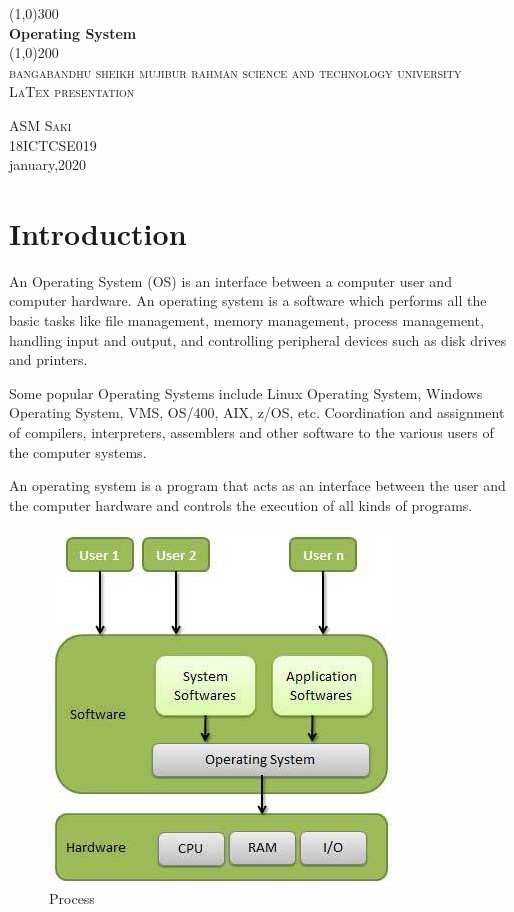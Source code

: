 \documentclass[a4paper,10pt]{article}
\begin{document}
  \begin{titlepage}
  \begin{center}
  \line(1,0){300}\\
  [.25in]
  \huge{\bfseries Operating System}\\
  [2mm]
  \line(1,0){200}\\
  [1.5cm]
  \textsc{\LARGE bangabandhu sheikh mujibur rahman science and technology university}\\
  [.75cm]
  \textsc{\small LaTex presentation}\\
  [10cm]
  \end{center}
 
  
  \begin{flushright}
  \textsc{\huge ASM Saki}\\
  \Large 18ICTCSE019\\
  january,2020
  \end{flushright}
  \end{titlepage}
  
 \section*{Introduction}
 
  An Operating System (OS) is an interface between a computer user and computer hardware. An operating system is a software which performs all the basic tasks like file management, memory management, process management, handling input and output, and controlling peripheral devices such as disk drives and printers.

Some popular Operating Systems include Linux Operating System, Windows Operating System, VMS, OS/400, AIX, z/OS, etc. Coordination and assignment of compilers, interpreters, assemblers and other software to the various users of the computer systems.

An operating system is a program that acts as an interface between the user and the computer hardware and controls the execution of all kinds of programs.
\begin{figure}[h]
\centering
\includegraphics{addk}
\caption{Process}
\end{figure}
 \cleardoublepage
  
\end{document}
